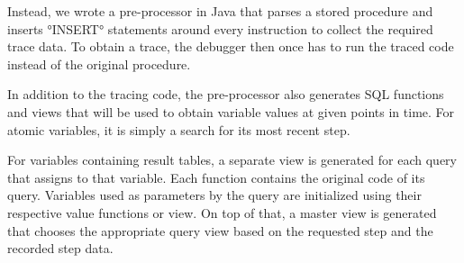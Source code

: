 \documentclass[english]{sig-alternate-05-2015}
\begin{document}
Instead, we wrote a pre-processor in Java that parses a stored procedure and inserts °INSERT° statements around every instruction to collect the required trace data.
To obtain a trace, the debugger then once has to run the traced code instead of the original procedure.

In addition to the tracing code, the pre-processor also generates SQL functions and views that will be used to obtain variable values at given points in time.
For atomic variables, it is simply a search for its most recent step.

For variables containing result tables, a separate view is generated for each query that assigns to that variable.
Each function contains the original code of its query.
Variables used as parameters by the query are initialized using their respective value functions or view.
On top of that, a master view is generated that chooses the appropriate query view based on the requested step and the recorded step data.

\end{document}
